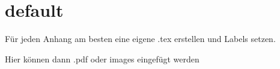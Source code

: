 \chapter{default}
\thispagestyle{anhang}
\label{anh:default}

Für jeden Anhang am besten eine eigene .tex erstellen und Labels setzen.

Hier können dann .pdf oder images eingefügt werden
